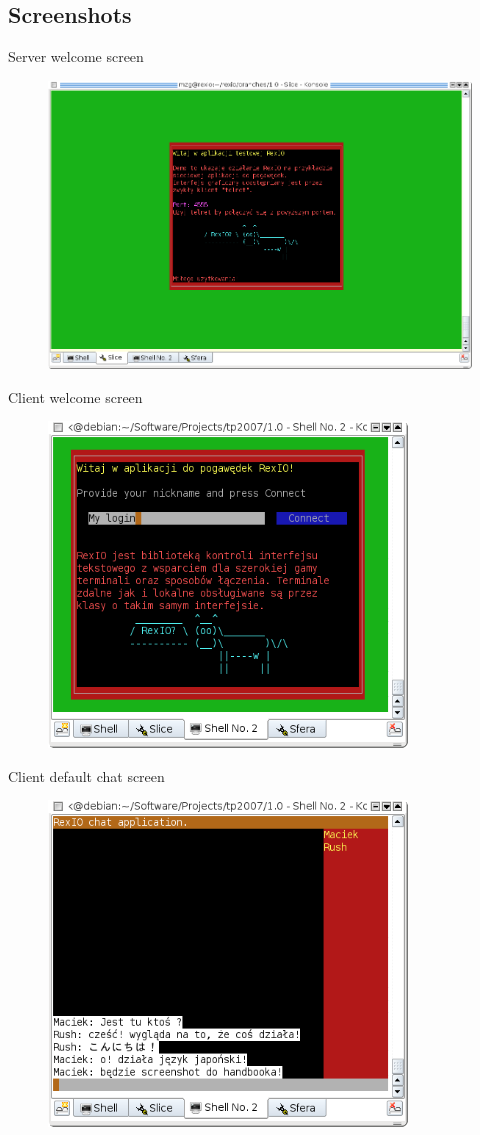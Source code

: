 \pagebreak
\subsection{Screenshots}
Server welcome screen
  \begin{figure}[H]
  \begin{center}
  \leavevmode\includegraphics[width=320pt]{graphics/ChatServer}
  \end{center}
  \end{figure}


Client welcome screen
  \begin{figure}[H]
  \begin{center}
  \leavevmode\includegraphics[width=270pt]{graphics/ChatLogin}
  \end{center}
  \end{figure}

\pagebreak
Client default chat screen
  \begin{figure}[H]
  \begin{center}
  \leavevmode\includegraphics[width=270pt]{graphics/Chat}
  \end{center}
  \end{figure}
